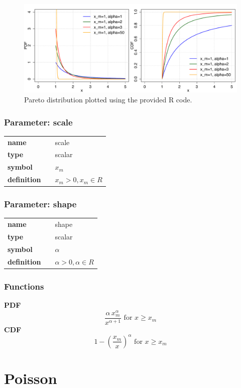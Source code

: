 \documentclass{article}
\begin{document}
\begin{figure}[ht!]
\centering
  \includegraphics[width=140mm]{pics/Pareto.pdf}
 \caption{Pareto distribution plotted using the provided R code.}
 \label{fig:Pareto}
\end{figure}

\subsubsection*{Parameter: scale}

\noindent\begin{tabular}{p{2cm}cl}
\textbf{name} & & scale \\
\textbf{type} & & scalar \\
\textbf{symbol} & & $x_m$  \\
\textbf{definition} & & $x_m > 0, x_m \in R$
\end{tabular}
\subsubsection*{Parameter: shape}

\noindent\begin{tabular}{p{2cm}cl}
\textbf{name} & & shape \\
\textbf{type} & & scalar \\
\textbf{symbol} & & $\alpha$  \\
\textbf{definition} & & $\alpha > 0, \alpha \in R$
\end{tabular}
\subsubsection*{Functions}

\smallskip \noindent \hspace{.2cm} \textbf{PDF} 
\begin{equation*}\frac{\alpha\,x_m^\alpha}{x^{\alpha+1}}\text{ for }x\ge x_m\end{equation*}
\smallskip \noindent \hspace{.2cm} \textbf{CDF} 
\begin{equation*}1-\left(\frac{x_m}{x}\right)^\alpha \text{ for } x \ge x_m\end{equation*}
\smallskip\section*{Poisson} 
\end{document}
